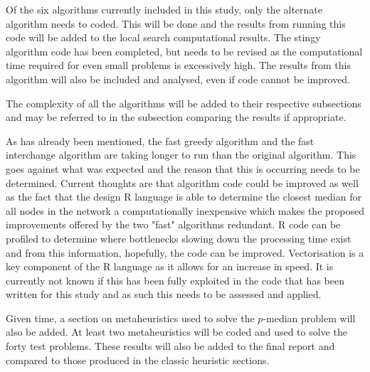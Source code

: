\documentclass[11pt]{article}
\newcommand{\np}{\newpage}
\begin{document}
	Of the six algorithms currently included in this study, only the alternate algorithm needs to coded.  This will be done and the results from running this code will be added to the local search computational results.  The stingy algorithm code has been completed, but needs to be revised as the computational time required for even small problems is excessively high.  The results from this algorithm will also be included and analysed, even if code cannot be improved.
	
	The complexity of all the algorithms will be added to their respective subsections and may be referred to in the subsection comparing the results if appropriate.
	
	As has already been mentioned, the fast greedy algorithm and the fast interchange algorithm are taking longer to run than the original algorithm.  This goes against what was expected and the reason that this is occurring needs to be determined.  Current thoughts are that algorithm code could be improved as well as the fact that the design R language is able to determine the closest median for all nodes in the network a computationally inexpensive which makes the proposed improvements offered by the two "fast" algorithms redundant.  R code can be profiled to determine where bottlenecks slowing down the processing time exist and from this information, hopefully, the code can be improved.  Vectorisation is a key component of the R language as it allows for an increase in speed.  It is currently not known if this has been fully exploited in the code that has been written for this study and as such this needs to be assessed and applied.
	
	Given time, a section on metaheuristics used to solve the $p$-median problem will also be added.  At least two metaheuristics will be coded and used to solve the forty test problems.  These results will also be added to the final report and compared to those produced in the classic heuristic sections.
		
	\np
	
	
	\np

	\printindex[terms]
	\printindex[authors]
	
\end{document}

